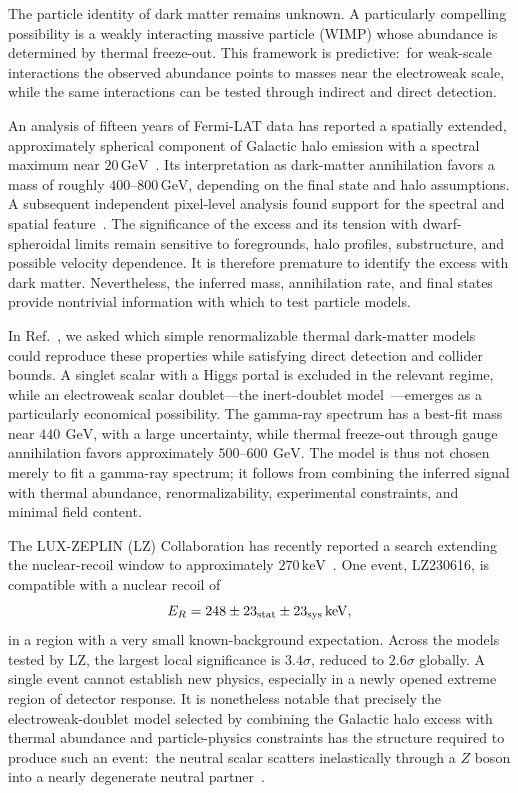 \documentclass[aps,prd,twocolumn,nofootinbib,superscriptaddress]{revtex4-2}
\newcommand{\GeV}{\,\mathrm{GeV}}
\newcommand{\keV}{\,\mathrm{keV}}
\begin{document}
The particle identity of dark matter remains unknown. A particularly compelling possibility is a weakly interacting massive particle (WIMP) whose abundance is determined by thermal freeze-out.  This framework is predictive:\ for weak-scale interactions the observed abundance points to masses near the electroweak scale, while the same interactions can be tested through indirect and direct detection.

An analysis of fifteen years of Fermi-LAT data has reported a spatially extended, approximately spherical component of Galactic halo emission with a spectral maximum near $20\GeV$~\cite{Totani:2025fxx}. Its interpretation as dark-matter annihilation favors a mass of roughly $400$--$800\,\mathrm{GeV}$, depending on the final state and halo assumptions. A subsequent independent pixel-level analysis found support for the spectral and spatial feature~\cite{Stenhouse:2026nve}. The significance of the excess and its tension with dwarf-spheroidal limits remain sensitive to foregrounds, halo profiles, substructure, and possible velocity dependence. It is therefore premature to identify the excess with dark matter. Nevertheless, the inferred mass, annihilation rate, and final states provide nontrivial information with which to test particle models.

In Ref.~\cite{Nomura:2026ntp}, we asked which simple renormalizable thermal dark-matter models could reproduce these properties while satisfying direct detection and collider bounds. A singlet scalar with a Higgs portal is excluded in the relevant regime, while an electroweak scalar doublet---the inert-doublet model~\cite{Deshpande:1977rw,Barbieri:2006dq,LopezHonorez:2006gr}---emerges as a particularly economical possibility. The gamma-ray spectrum has a best-fit mass near $440~\GeV$, with a large uncertainty, while thermal freeze-out through gauge annihilation favors approximately $500$--$600~\GeV$. The model is thus not chosen merely to fit a gamma-ray spectrum; it follows from combining the inferred signal with thermal abundance, renormalizability, experimental constraints, and minimal field content.

The LUX-ZEPLIN (LZ) Collaboration has recently reported a search extending the nuclear-recoil window to approximately $270\keV$~\cite{LZ:2026}. One event, LZ230616, is compatible with a nuclear recoil of
%
\begin{equation}
  E_R = 248 \pm 23_{\rm stat} \pm 23_{\rm sys} \keV,
\end{equation}
%
in a region with a very small known-background expectation. Across the models tested by LZ, the largest local significance is $3.4\sigma$, reduced to $2.6\sigma$ globally. A single event cannot establish new physics, especially in a newly opened extreme region of detector response. It is nonetheless notable that precisely the electroweak-doublet model selected by combining the Galactic halo excess with thermal abundance and particle-physics constraints has the structure required to produce such an event:\ the neutral scalar scatters inelastically through a $Z$ boson into a nearly degenerate neutral partner~\cite{Tucker-Smith:2001myb,Nomura:2026ntp}.
\end{document}
